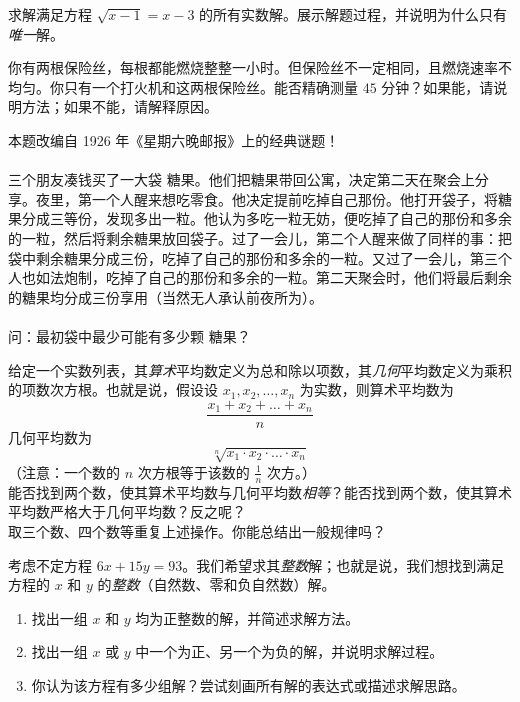 \begin{exercise}
    求解满足方程 $\sqrt{x - 1} = x - 3$ 的所有实数解。展示解题过程，并说明为什么只有\emph{唯一}解。
\end{exercise}

\begin{exercise}
    你有两根保险丝，每根都能燃烧整整一小时。但保险丝不一定相同，且燃烧速率不均匀。你只有一个打火机和这两根保险丝。能否精确测量 $45$ 分钟？如果能，请说明方法；如果不能，请解释原因。
\end{exercise}

\begin{exercise}
    本题改编自 1926 年《星期六晚邮报》上的经典谜题！\\
    \\
    三个朋友凑钱买了一大袋  糖果。他们把糖果带回公寓，决定第二天在聚会上分享。夜里，第一个人醒来想吃零食。他决定提前吃掉自己那份。他打开袋子，将糖果分成三等份，发现多出一粒。他认为多吃一粒无妨，便吃掉了自己的那份和多余的一粒，然后将剩余糖果放回袋子。过了一会儿，第二个人醒来做了同样的事：把袋中剩余糖果分成三份，吃掉了自己的那份和多余的一粒。又过了一会儿，第三个人也如法炮制，吃掉了自己的那份和多余的一粒。第二天聚会时，他们将最后剩余的糖果均分成三份享用（当然无人承认前夜所为）。\\
    \\
    问：最初袋中最少可能有多少颗  糖果？
\end{exercise}

\begin{exercise}
    给定一个实数列表，其\emph{算术}平均数定义为总和除以项数，其\emph{几何}平均数定义为乘积的项数次方根。也就是说，假设设 $x_1, x_2, \dots , x_n$ 为实数，则算术平均数为
    \[\frac{x_1+x_2+ \dots + x_n}{n}\]
    几何平均数为
    \[\sqrt[n]{x_1 \cdot x_2 \cdot \dots \cdot x_n}\]
    （注意：一个数的 $n$ 次方根等于该数的 $\frac{1}{n}$ 次方。）
    \\
    能否找到两个数，使其算术平均数与几何平均数\emph{相等}？能否找到两个数，使其算术平均数严格大于几何平均数？反之呢？
    \\
    取三个数、四个数等重复上述操作。你能总结出一般规律吗？
\end{exercise}

\begin{exercise}
    考虑不定方程 $6x + 15y = 93$。我们希望求其\emph{整数}解；也就是说，我们想找到满足方程的 $x$ 和 $y$ 的\emph{整数}（自然数、零和负自然数）解。

    \begin{enumerate}
        \item 找出一组 $x$ 和 $y$ 均为正整数的解，并简述求解方法。
        \item 找出一组 $x$ 或 $y$ 中一个为正、另一个为负的解，并说明求解过程。
        \item 你认为该方程有多少组解？尝试刻画所有解的表达式或描述求解思路。
    \end{enumerate}
\end{exercise}

